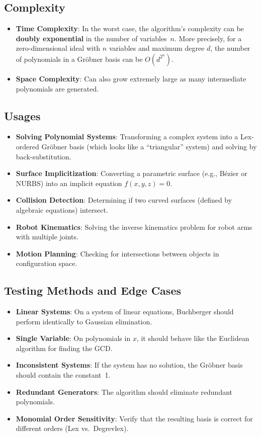 \subsection{Complexity}
\begin{itemize}
    \item \textbf{Time Complexity}: In the worst case, the algorithm's complexity can be \textbf{doubly exponential} in the number of variables~$n$. More precisely, for a zero-dimensional ideal with $n$ variables and maximum degree $d$, the number of polynomials in a Gr\"obner basis can be $O(d^{2^n})$.
    \item \textbf{Space Complexity}: Can also grow extremely large as many intermediate polynomials are generated.
\end{itemize}

\subsection{Usages}
\begin{itemize}
    \item \textbf{Solving Polynomial Systems}: Transforming a complex system into a Lex-ordered Gr\"obner basis (which looks like a ``triangular'' system) and solving by back-substitution.
    \item \textbf{Surface Implicitization}: Converting a parametric surface (e.g., B\'ezier or NURBS) into an implicit equation $f(x, y, z) = 0$.
    \item \textbf{Collision Detection}: Determining if two curved surfaces (defined by algebraic equations) intersect.
    \item \textbf{Robot Kinematics}: Solving the inverse kinematics problem for robot arms with multiple joints.
    \item \textbf{Motion Planning}: Checking for intersections between objects in configuration space.
\end{itemize}

\subsection{Testing Methods and Edge Cases}
\begin{itemize}
    \item \textbf{Linear Systems}: On a system of linear equations, Buchberger should perform identically to Gaussian elimination.
    \item \textbf{Single Variable}: On polynomials in $x$, it should behave like the Euclidean algorithm for finding the GCD.
    \item \textbf{Inconsistent Systems}: If the system has no solution, the Gr\"obner basis should contain the constant~1.
    \item \textbf{Redundant Generators}: The algorithm should eliminate redundant polynomials.
    \item \textbf{Monomial Order Sensitivity}: Verify that the resulting basis is correct for different orders (Lex vs.\ Degrevlex).
\end{itemize}

